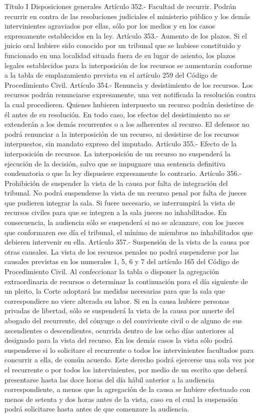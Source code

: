     Título I
    Disposiciones generales
    Artículo 352.- Facultad de recurrir. Podrán recurrir en contra de las resoluciones judiciales el ministerio público y los demás intervinientes agraviados por ellas, sólo por los medios y en los casos expresamente establecidos en la ley.
    Artículo 353.- Aumento de los plazos. Si el juicio oral hubiere sido conocido por un tribunal que se hubiese constituido y funcionado en una localidad situada fuera de su lugar de asiento, los plazos legales establecidos para la interposición de los recursos se aumentarán conforme a la tabla de emplazamiento prevista en el artículo 259 del Código de Procedimiento Civil.
    Artículo 354.- Renuncia y desistimiento de los recursos. Los recursos podrán renunciarse expresamente, una vez notificada la resolución contra la cual procedieren.
    Quienes hubieren interpuesto un recurso podrán desistirse de él antes de su resolución. En todo caso, los efectos del desistimiento no se extenderán a los demás recurrentes o a los adherentes al recurso.
    El defensor no podrá renunciar a la interposición de un recurso, ni desistirse de los recursos interpuestos, sin mandato expreso del imputado.
    Artículo 355.- Efecto de la interposición de recursos. La interposición de un recurso no suspenderá la ejecución de la decisión, salvo que se impugnare una sentencia definitiva condenatoria o que la ley dispusiere expresamente lo contrario.
    Artículo 356.- Prohibición de suspender la vista de la causa por falta de integración del tribunal. No podrá suspenderse la vista de un recurso penal por falta de jueces que pudieren integrar la sala. Si fuere necesario, se interrumpirá la vista de recursos civiles para que se integren a la sala jueces no inhabilitados. En consecuencia, la audiencia sólo se suspenderá si no se alcanzare, con los jueces que conformaren ese día el tribunal, el mínimo de miembros no inhabilitados que debieren intervenir en ella.
    Artículo 357.- Suspensión de la vista de la causa por otras causales. La vista de los recursos penales no podrá suspenderse por las causales previstas en los numerales 1, 5, 6 y 7 del artículo 165 del Código de Procedimiento Civil.
    Al confeccionar la tabla o disponer la agregación extraordinaria de recursos o determinar la continuación para el día siguiente de un pleito, la Corte adoptará las medidas necesarias para que la sala que correspondiere no viere alterada su labor.
    Si en la causa hubiere personas privadas de libertad, sólo se suspenderá la vista de la causa por muerte del abogado del recurrente, del cónyuge o del conviviente civil o de alguno de sus ascendientes o descendientes, ocurrida dentro de los ocho días anteriores al designado para la vista del recurso.
    En los demás casos la vista sólo podrá suspenderse si lo solicitare el recurrente o todos los intervinientes facultados para concurrir a ella, de común acuerdo. Este derecho podrá ejercerse una sola vez por el recurrente o por todos los intervinientes, por medio de un escrito que deberá presentarse hasta las doce horas del día hábil anterior a la audiencia correspondiente, a menos que la agregación de la causa se hubiere efectuado con menos de setenta y dos horas antes de la vista, caso en el cual la suspensión podrá solicitarse hasta antes de que comenzare la audiencia.

